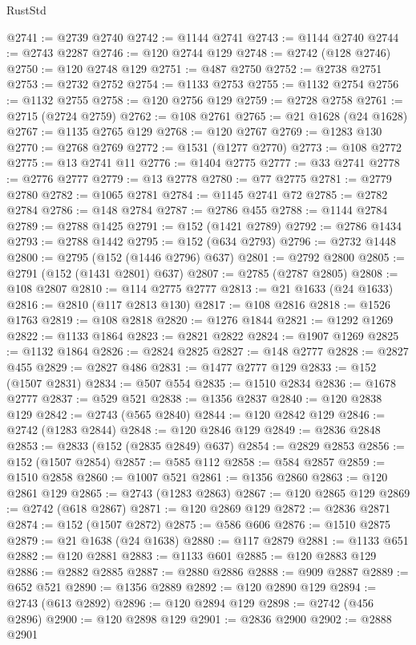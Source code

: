 \begin{lexlean}{RustStd}
\begin{coremodule}
@2741 := @2739 @2740
@2742 := @1144 @2741
@2743 := @1144 @2740
@2744 := @2743 @2287
@2746 := @120 @2744 @129
@2748 := @2742 (@128 @2746)
@2750 := @120 @2748 @129
@2751 := @487 @2750
@2752 := @2738 @2751
@2753 := @2732 @2752
@2754 := @1133 @2753
@2755 := @1132 @2754
@2756 := @1132 @2755
@2758 := @120 @2756 @129
@2759 := @2728 @2758
@2761 := @2715 (@2724 @2759)
@2762 := @108 @2761
@2765 := @21 @1628 (@24 @1628)
@2767 := @1135 @2765 @129
@2768 := @120 @2767
@2769 := @1283 @130
@2770 := @2768 @2769
@2772 := @1531 (@1277 @2770)
@2773 := @108 @2772
@2775 := @13 @2741 @11
@2776 := @1404 @2775
@2777 := @33 @2741
@2778 := @2776 @2777
@2779 := @13 @2778
@2780 := @77 @2775
@2781 := @2779 @2780
@2782 := @1065 @2781
@2784 := @1145 @2741 @72
@2785 := @2782 @2784
@2786 := @148 @2784
@2787 := @2786 @455
@2788 := @1144 @2784
@2789 := @2788 @1425
@2791 := @152 (@1421 @2789)
@2792 := @2786 @1434
@2793 := @2788 @1442
@2795 := @152 (@634 @2793)
@2796 := @2732 @1448
@2800 := @2795 (@152 (@1446 @2796) @637)
@2801 := @2792 @2800
@2805 := @2791 (@152 (@1431 @2801) @637)
@2807 := @2785 (@2787 @2805)
@2808 := @108 @2807
@2810 := @114 @2775 @2777
@2813 := @21 @1633 (@24 @1633)
@2816 := @2810 (@117 @2813 @130)
@2817 := @108 @2816
@2818 := @1526 @1763
@2819 := @108 @2818
@2820 := @1276 @1844
@2821 := @1292 @1269
@2822 := @1133 @1864
@2823 := @2821 @2822
@2824 := @1907 @1269
@2825 := @1132 @1864
@2826 := @2824 @2825
@2827 := @148 @2777
@2828 := @2827 @455
@2829 := @2827 @486
@2831 := @1477 @2777 @129
@2833 := @152 (@1507 @2831)
@2834 := @507 @554
@2835 := @1510 @2834
@2836 := @1678 @2777
@2837 := @529 @521
@2838 := @1356 @2837
@2840 := @120 @2838 @129
@2842 := @2743 (@565 @2840)
@2844 := @120 @2842 @129
@2846 := @2742 (@1283 @2844)
@2848 := @120 @2846 @129
@2849 := @2836 @2848
@2853 := @2833 (@152 (@2835 @2849) @637)
@2854 := @2829 @2853
@2856 := @152 (@1507 @2854)
@2857 := @585 @112
@2858 := @584 @2857
@2859 := @1510 @2858
@2860 := @1007 @521
@2861 := @1356 @2860
@2863 := @120 @2861 @129
@2865 := @2743 (@1283 @2863)
@2867 := @120 @2865 @129
@2869 := @2742 (@618 @2867)
@2871 := @120 @2869 @129
@2872 := @2836 @2871
@2874 := @152 (@1507 @2872)
@2875 := @586 @606
@2876 := @1510 @2875
@2879 := @21 @1638 (@24 @1638)
@2880 := @117 @2879
@2881 := @1133 @651
@2882 := @120 @2881
@2883 := @1133 @601
@2885 := @120 @2883 @129
@2886 := @2882 @2885
@2887 := @2880 @2886
@2888 := @909 @2887
@2889 := @652 @521
@2890 := @1356 @2889
@2892 := @120 @2890 @129
@2894 := @2743 (@613 @2892)
@2896 := @120 @2894 @129
@2898 := @2742 (@456 @2896)
@2900 := @120 @2898 @129
@2901 := @2836 @2900
@2902 := @2888 @2901

\end{coremodule}
\end{lexlean}
